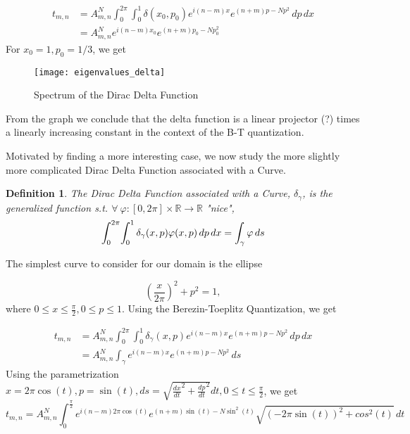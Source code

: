 \documentclass{article}
\newtheorem{mydef}{Definition}[section]
\begin{document}
\begin{equation} 
\begin{split} 
t_{m,n} &=  A_{m,n}^N\int^{2\pi}_{0} \! \int^{1}_{0}\delta(x_{0},p_{0})e^{i(n-m)x}e^{(n+m)p-Np^{2}} \,dp \,dx \\ 
&=A_{m,n}^Ne^{i(n-m)x_{0}}e^{(n+m)p_{0}-Np_{0}^{2}} 
\end{split} 
\end{equation} For $x_{0} = 1, p_{0} = 1/3$, we get 

\begin{figure} [H]\centerline{\texttt{[image: eigenvalues\_delta]}} \caption{Spectrum of the Dirac Delta Function} \end{figure} From the graph we conclude that the delta function is a linear projector (?) times a linearly increasing constant in the context of the B-T quantization.

Motivated by finding a more interesting case, we now study the more slightly more complicated Dirac Delta Function associated with a Curve.
 
\begin{mydef} The Dirac Delta Function associated with a Curve, $\delta_{\gamma}$, is the generalized function s.t. $\forall\ \varphi: [0,2\pi] \times \mathbb{R} \rightarrow \mathbb{R}$ "nice", $$  \int^{2\pi}_{0} \! \int^{1}_{0}\delta_{\gamma}(x,p)\varphi(x,p) \,dp \,dx \\ = \int_{\gamma} \varphi \,ds$$ 
\end{mydef} The simplest curve to consider for our domain is the ellipse 

\begin{equation} 
\left(\frac{x}{2\pi}\right)^2 + p^2  = 1, \nonumber 
\end{equation} where $0\le x\le\frac{\pi}{2}, 0\le p \le 1$. Using the Berezin-Toeplitz Quantization, we get 

\begin{equation}
\begin{split}
t_{m,n} &= A_{m,n}^N\int^{2\pi}_{0} \! \int^{1}_{0}\delta_{\gamma}(x,p)e^{i(n-m)x}e^{(n+m)p-Np^{2}} \,dp \,dx \\ \nonumber
&= A_{m,n}^N\int_{\gamma} e^{i(n-m)x}e^{(n+m)p-Np^{2}} \,ds
\end{split}
\end{equation} Using the parametrization $x = 2\pi\cos(t), p = \sin(t), ds = \sqrt{\frac{dx}{dt}^2 + \frac{dp}{dt}^2}dt, 0\le t \le \frac{\pi}{2}$, we get
\begin{equation}
t_{m,n} = A_{m,n}^N\int_{0}^{\frac{\pi}{2}} e^{i(n-m)2\pi\cos(t)}e^{(n+m)\sin(t)-N\sin^{2}(t)}\sqrt{(-2\pi\sin(t))^2 + cos^2(t)} \,dt
\end{equation}
\end{document}
